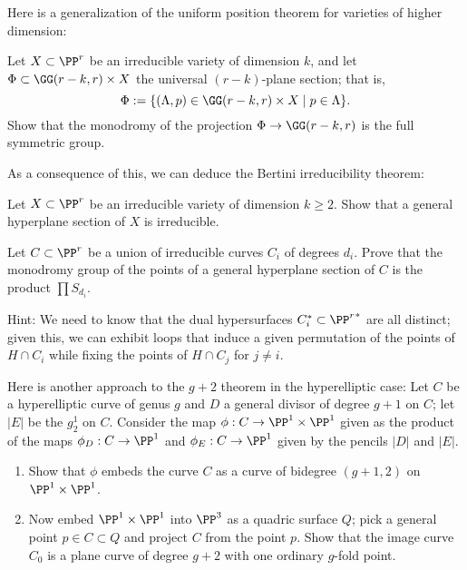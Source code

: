 Here is a generalization of the uniform position theorem for varieties of higher dimension:

\begin{exercise}
Let $X \subset \PP^r$ be an irreducible variety of dimension $k$, and let $\Phi \subset \GG(r-k, r) \times X$ the universal $(r-k)$-plane section; that is,
$$
\Phi := \{ (\Lambda, p) \in \GG(r-k,r) \times X \mid p \in \Lambda \}.
$$
Show that the monodromy of the projection $\Phi \to \GG(r-k,r)$ is the full symmetric group.
\end{exercise}

As a consequence of this, we can deduce the Bertini irreducibility theorem:

\begin{exercise}
Let $X \subset \PP^r$ be an irreducible variety of dimension $k \geq 2$. Show that a general hyperplane section of $X$ is irreducible.
\end{exercise}

\begin{exercise}
Let $C \subset \PP^r$ be a union of irreducible curves $C_i$ of degrees $d_i$. Prove that the monodromy group of the points of a general hyperplane section of $C$ is the product $\prod S_{d_i}$.
\end{exercise}

Hint: We need to know that the dual hypersurfaces $C_i^* \subset {\PP^r}^*$ are all distinct; given this, we can exhibit loops that induce a given permutation of the points of $H \cap C_i$ while fixing the points of $H \cap C_j$ for $j \neq i$.


\begin{exercise}
Here is another approach to the $g+2$ theorem in the hyperelliptic case: 
Let $C$ be a hyperelliptic curve of genus $g$ and $D$ a general divisor of degree $g+1$ on $C$; let $|E|$ be the $g^1_2$ on $C$.
Consider the map $\phi : C \to \PP^1 \times \PP^1$ given as the product of the maps $\phi_D : C \to \PP^1$ and $\phi_E : C \to \PP^1$ given by the pencils $|D|$ and $|E|$.
\begin{enumerate}
\item Show that $\phi$ embeds the curve $C$ as a curve of bidegree $(g+1,2)$ on $\PP^1 \times \PP^1$.
\item Now embed $\PP^1 \times \PP^1$ into $\PP^3$ as a quadric surface $Q$; pick a general point $p \in C \subset Q$ and project $C$ from the point $p$. Show that the image curve $C_0$ is a plane curve of degree $g+2$ with one ordinary $g$-fold point.
\end{enumerate}
\end{exercise}

